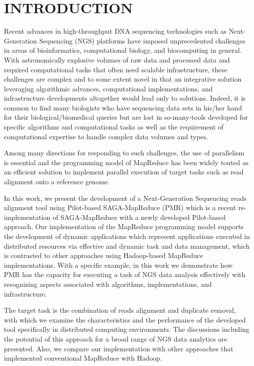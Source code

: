 \documentclass{sig-alternate}
\begin{document}
\section{INTRODUCTION} 
Recent advances in high-throughput DNA sequencing technologies such as Next-Generation Sequencing (NGS) platforms have  imposed unprecedented challenges in  areas of bioinformatics, computational biology, and biocomputing in general\cite{metzker2010,1000genome,wang2009-natrevgen,alex2009,mcpherson2009}.  With astronomically explosive volumes of raw data and processed data and required computational tasks that often need scalable infrastructure, these challenges are complex and to some extent novel in that an integrative solution leveraging algorithmic advances, computational implementations, and infrastructure developments altogether would lead only to solutions. Indeed, it is common to find many biologists who have sequencing data sets in his/her hand for their biological/biomedical queries but are lost in so-many-tools developed for specific algorithms and computational tasks as well as the requirement of computational expertise to handle complex data volumes and types.  

Among many directions for responding to such challenges, the use of parallelism is essential and the programming model of MapReduce has been widely touted as an efficient solution to implement parallel execution of target tasks such as read alignment onto a reference genome\cite{cloudburst, gatk,langmead2009,seal2011,langmead2010, taylor2010}.

In this work, we present the development of a Next-Generation Sequencing reads alignment tool using Pilot-based SAGA-MapReduce (PMR) which is a recent re-implementation of SAGA-MapReduce with a newly developed Pilot-based approach\cite{Sehgal2011590,pmr2011}.  Our implementation of the MapReduce programming model supports the development of dynamic applications which represent applications executed in distributed resources via effective and dynamic task and data management, which is contrasted to other approaches using Hadoop-based MapReduce implementations\cite{cloudburst,langmead2009,seal2011,langmead2010}.  With a specific example, in this work we demonstrate how PMR has the capacity for executing a task of NGS data analysis effectively with recognizing aspects associated with algorithms, implementations, and infrastructure.

The target task is the combination of reads alignment and duplicate removal, with which we examine the characteristics and the performance of the developed tool specifically in distributed computing environments.  The discussions including the potential of this approach for a broad range of NGS data analytics are presented.  Also, we compare our implementation with other approaches that implemented conventional MapReduce with Hadoop.
\end{document}
